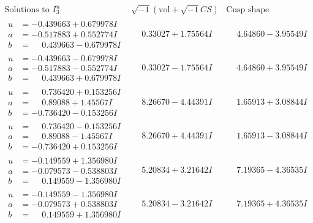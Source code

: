 \documentclass[1p]{elsarticle_modified}
\theoremstyle{definition}
\newcommand{\I}{\sqrt{-1}}
\begin{document}
$$\begin{array}{c|c|c}  
\text{Solutions to }I^u_{3}& \I (\text{vol} + \sqrt{-1}CS) & \text{Cusp shape}\\
 \hline 
\begin{aligned}
u &= -0.439663 + 0.679978 I \\
a &= -0.517883 + 0.552774 I \\
b &= \phantom{-}0.439663 - 0.679978 I\end{aligned}
 & \phantom{-}0.33027 + 1.75564 I & \phantom{-}4.64860 - 3.95549 I \\ \hline\begin{aligned}
u &= -0.439663 - 0.679978 I \\
a &= -0.517883 - 0.552774 I \\
b &= \phantom{-}0.439663 + 0.679978 I\end{aligned}
 & \phantom{-}0.33027 - 1.75564 I & \phantom{-}4.64860 + 3.95549 I \\ \hline\begin{aligned}
u &= \phantom{-}0.736420 + 0.153256 I \\
a &= \phantom{-}0.89088 + 1.45567 I \\
b &= -0.736420 - 0.153256 I\end{aligned}
 & \phantom{-}8.26670 - 4.44391 I & \phantom{-}1.65913 + 3.08844 I \\ \hline\begin{aligned}
u &= \phantom{-}0.736420 - 0.153256 I \\
a &= \phantom{-}0.89088 - 1.45567 I \\
b &= -0.736420 + 0.153256 I\end{aligned}
 & \phantom{-}8.26670 + 4.44391 I & \phantom{-}1.65913 - 3.08844 I \\ \hline\begin{aligned}
u &= -0.149559 + 1.356980 I \\
a &= -0.079573 - 0.538803 I \\
b &= \phantom{-}0.149559 - 1.356980 I\end{aligned}
 & \phantom{-}5.20834 + 3.21642 I & \phantom{-}7.19365 - 4.36535 I \\ \hline\begin{aligned}
u &= -0.149559 - 1.356980 I \\
a &= -0.079573 + 0.538803 I \\
b &= \phantom{-}0.149559 + 1.356980 I\end{aligned}
 & \phantom{-}5.20834 - 3.21642 I & \phantom{-}7.19365 + 4.36535 I \\ \hline\begin{aligned}

\end{aligned}
\end{array}$$
\end{document}
